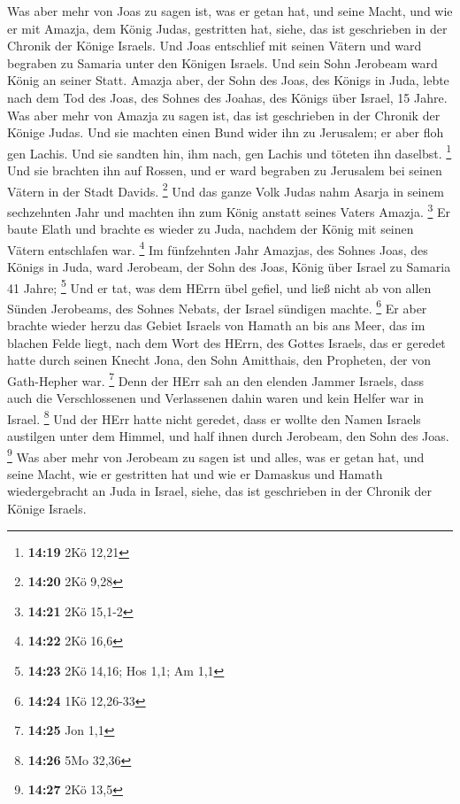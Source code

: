  Was aber mehr von Joas zu sagen ist, was er getan hat, und
seine Macht, und wie er mit Amazja, dem König Judas, gestritten hat,
siehe, das ist geschrieben in der Chronik der Könige Israels.
 Und Joas entschlief mit seinen Vätern und ward begraben zu
Samaria unter den Königen Israels. Und sein Sohn Jerobeam ward König an
seiner Statt.  Amazja aber, der Sohn des Joas, des Königs
in Juda, lebte nach dem Tod des Joas, des Sohnes des Joahas, des Königs
über Israel, 15 Jahre.  Was aber mehr von Amazja zu sagen
ist, das ist geschrieben in der Chronik der Könige Judas. 
Und sie machten einen Bund wider ihn zu Jerusalem; er aber floh gen
Lachis. Und sie sandten hin, ihm nach, gen Lachis und töteten ihn
daselbst. \footnote{\textbf{14:19} 2Kö 12,21}  Und sie
brachten ihn auf Rossen, und er ward begraben zu Jerusalem bei seinen
Vätern in der Stadt Davids. \footnote{\textbf{14:20} 2Kö 9,28}
 Und das ganze Volk Judas nahm Asarja in seinem sechzehnten
Jahr und machten ihn zum König anstatt seines Vaters Amazja. \footnote{\textbf{14:21}
  2Kö 15,1-2}  Er baute Elath und brachte es wieder zu
Juda, nachdem der König mit seinen Vätern entschlafen war. \footnote{\textbf{14:22}
  2Kö 16,6}  Im fünfzehnten Jahr Amazjas, des Sohnes Joas,
des Königs in Juda, ward Jerobeam, der Sohn des Joas, König über Israel
zu Samaria 41 Jahre; \footnote{\textbf{14:23} 2Kö 14,16; Hos 1,1; Am 1,1}
 Und er tat, was dem HErrn übel gefiel, und ließ nicht ab
von allen Sünden Jerobeams, des Sohnes Nebats, der Israel sündigen
machte. \footnote{\textbf{14:24} 1Kö 12,26-33}  Er aber
brachte wieder herzu das Gebiet Israels von Hamath an bis ans Meer, das
im blachen Felde liegt, nach dem Wort des HErrn, des Gottes Israels, das
er geredet hatte durch seinen Knecht Jona, den Sohn Amitthais, den
Propheten, der von Gath-Hepher war. \footnote{\textbf{14:25} Jon 1,1}
 Denn der HErr sah an den elenden Jammer Israels, dass auch
die Verschlossenen und Verlassenen dahin waren und kein Helfer war in
Israel. \footnote{\textbf{14:26} 5Mo 32,36}  Und der HErr
hatte nicht geredet, dass er wollte den Namen Israels austilgen unter
dem Himmel, und half ihnen durch Jerobeam, den Sohn des Joas.
\footnote{\textbf{14:27} 2Kö 13,5}  Was aber mehr von
Jerobeam zu sagen ist und alles, was er getan hat, und seine Macht, wie
er gestritten hat und wie er Damaskus und Hamath wiedergebracht an Juda
in Israel, siehe, das ist geschrieben in der Chronik der Könige Israels.
